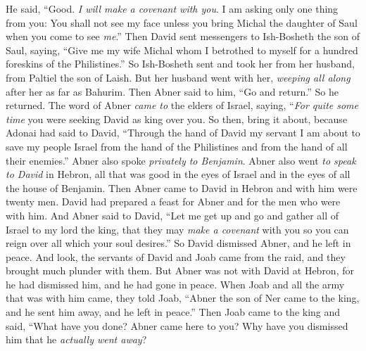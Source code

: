 \begin{biblechapter}
\verse He said, “Good. \textit{I will make a covenant with you}. I am asking only one thing from you: You shall not see my face unless you bring Michal the daughter of Saul when you come to see \textit{me}.”
\verse Then David sent messengers to Ish-Bosheth the son of Saul, saying, “Give me my wife Michal whom I betrothed to myself for a hundred foreskins of the Philistines.”
\verse So Ish-Bosheth sent and took her from her husband, from Paltiel the son of Laish.
\verse But her husband went with her, \textit{weeping all along} after her as far as Bahurim. Then Abner said to him, “Go and return.” So he returned.
\verse The word of Abner \textit{came to} the elders of Israel, saying, “\textit{For quite some time} you were seeking David as king over you.
\verse So then, bring it about, because Adonai had said to David, “Through the hand of David my servant I am about to save my people Israel from the hand of the Philistines and from the hand of all their enemies.”
\verse Abner also spoke \textit{privately to Benjamin}. Abner also went \textit{to speak to David} in Hebron, all that was good in the eyes of Israel and in the eyes of all the house of Benjamin.
\verse Then Abner came to David in Hebron and with him were twenty men. David had prepared a feast for Abner and for the men who were with him.
\verse And Abner said to David, “Let me get up and go and gather all of Israel to my lord the king, that they may \textit{make a covenant} with you so you can reign over all which your soul desires.” So David dismissed Abner, and he left in peace.
\verse And look, the servants of David and Joab came from the raid, and they brought much plunder with them. But Abner was not with David at Hebron, for he had dismissed him, and he had gone in peace.
\verse When Joab and all the army that was with him came, they told Joab, “Abner the son of Ner came to the king, and he sent him away, and he left in peace.”
 Then Joab came to the king and said, “What have you done? Abner came here to you? Why have you dismissed him that he \textit{actually went away}?

\end{biblechapter}
